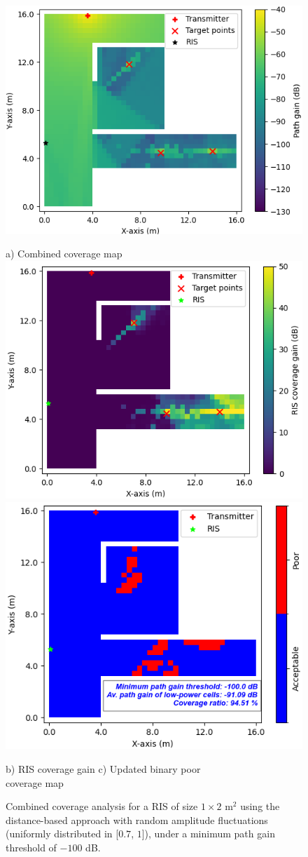\documentclass{IEEEoj}
\begin{document}
\begin{figure}
	\centering
	\includegraphics[width=0.8\linewidth]{Sim_Results/amp_change_Comb_cov_1x2_Distance.png}
	
	a) Combined coverage map \\[5pt]
	
	\includegraphics[width=0.49\linewidth]{Sim_Results/amp_change_RIS_cov_gain_1x2_Distance.png}
	\hfill
	\includegraphics[width=0.48\linewidth]{Sim_Results/amp_change_New_Binary_Cov_Map_1x2_Distance.png}
	
	\hspace{10pt} b) RIS coverage gain \hspace{30pt} c) Updated binary poor \\ \hspace{140pt} coverage map
	\caption{Combined coverage analysis for a RIS of size $1 \times 2$ m$^2$ using the distance-based approach with random amplitude fluctuations (uniformly distributed in [$0.7$, $1$]), under a minimum path gain threshold of $-100$ dB.}
	\label{amp_change_comb_cov_distance}
\end{figure}
\end{document}
